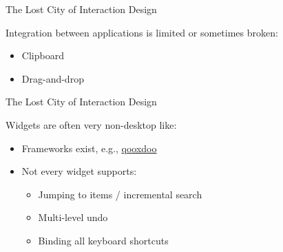 \begin{frame}{The Lost City of Interaction Design} %

Integration between applications is limited or sometimes broken:

  \begin{itemize}[<.->]
  \tightlist
  \item
    Clipboard
  \item
    Drag-and-drop
  \end{itemize}

\end{frame}
\begin{frame}{The Lost City of Interaction Design} %

Widgets are often very non-desktop like:

  \begin{itemize}[<+->]
  \tightlist
  \item
    Frameworks exist, e.g.,
    \href{https://qooxdoo.org/}{qooxdoo}
  \item
    Not every widget supports:

    \begin{itemize}[<.->]
    \tightlist
    \item
      Jumping to items / incremental search
    \item
      Multi-level undo
    \item
      Binding all keyboard shortcuts
    \end{itemize}
  \end{itemize}

\end{frame}

